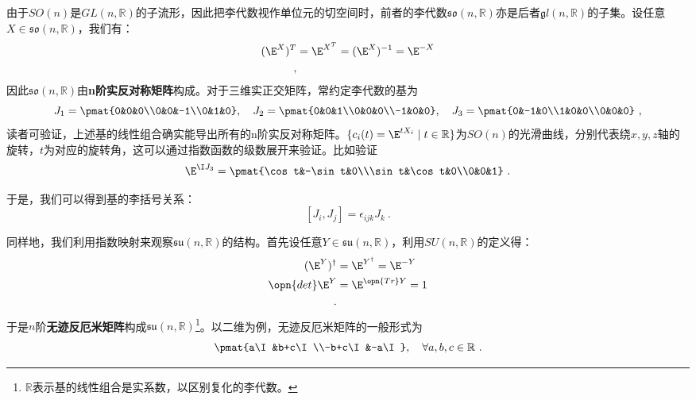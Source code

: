 由于$SO(n)$是$GL(n,\mathbb R)$的子流形，因此把李代数视作单位元的切空间时，前者的李代数$\mathfrak {so}(n,\mathbb R)$亦是后者$\mathfrak gl(n,\mathbb R)$的子集。设任意$X\in \mathfrak {so}(n,\mathbb R)$，我们有：
\begin{equation}
\begin{aligned}
(\E^{X})^T&=\E^{X^T}=(\E^{X})^{-1}=\E^{-X}\\
~,
\end{aligned}
\end{equation}
因此$\mathfrak {so}(n,\mathbb R)$由\textbf{n阶实反对称矩阵}构成。对于三维实正交矩阵，常约定李代数的基为
\begin{equation}J_1=\pmat{0&0&0\\0&0&-1\\0&1&0},\quad J_2=\pmat{0&0&1\\0&0&0\\-1&0&0},\quad J_3=\pmat{0&-1&0\\1&0&0\\0&0&0}~,\end{equation}
读者可验证，上述基的线性组合确实能导出所有的n阶实反对称矩阵。$\{c_i(t)=\E^{tX_i}\mid t\in \mathbb R\}$为$SO(n)$的光滑曲线，分别代表绕$x,y,z$轴的旋转，$t$为对应的旋转角，这可以通过指数函数的级数展开来验证。比如验证
\begin{equation}
\E^{\I J_3}=\pmat{\cos t&-\sin t&0\\\sin t&\cos t&0\\0&0&1}~.
\end{equation}


于是，我们可以得到基的李括号关系：
\begin{equation}\label{eq_LieGA_5}
[J_i,J_j]=\epsilon_{ijk}J_k~.
\end{equation}

同样地，我们利用指数映射来观察$\mathfrak {su}(n,\mathbb R)$的结构。首先设任意$Y\in \mathfrak {su}(n,\mathbb R)$，利用$SU(n,\mathbb R)$的定义得：
\begin{equation}
\begin{aligned}
(\E^Y)^{\dagger}&=\E^{Y^{\dagger}}=\E^{-Y}\\
\opn{det}\E^{Y}&=\E^{\opn{Tr}Y}=1\\
~.
\end{aligned}
\end{equation}
于是$n$阶\textbf{无迹}\textbf{反厄米矩阵}构成$\mathfrak {su}(n,\mathbb R)$\footnote{$\mathbb R$表示基的线性组合是实系数，以区别复化的李代数。}。以二维为例，无迹反厄米矩阵的一般形式为
\begin{equation}
\pmat{a\I&b+c\I\\-b+c\I&-a\I},\quad\forall a,b,c\in \mathbb R~.
\end{equation}

